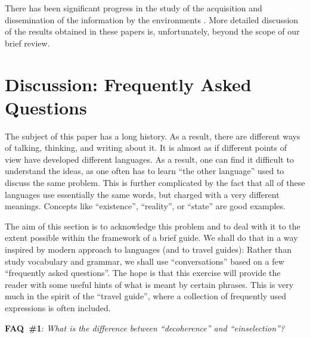 \documentclass[aps,amsmath,amssymb,amsfonts,floatfix]{revtex4-1}
\newcommand{\+}         {\dagger}
\begin{document}
{{{There has been significant progress in the study of the acquisition and dissemination of the information by the environments \cite{QD}. More detailed discussion of the results obtained in these papers is, unfortunately, beyond the scope of our brief review.


\section{Discussion: Frequently Asked Questions}

The subject of this paper has a long history. As a result, there are different ways of talking, thinking, and writing about it. It is almost as if different points of view have developed different languages. As a result, one can find it difficult to understand the ideas, as one often has to learn ``the other language'' used to discuss the same problem. This is further complicated by the fact that all of these languages use essentially the same words, but charged with a very different meanings. Concepts like ``existence'', ``reality'', or ``state'' are good examples.

The aim of this section is to acknowledge this problem and to deal with it to the extent possible within the framework of a brief guide. We shall do that in a way inspired by modern approach to languages (and to travel guides): Rather than study vocabulary and grammar, we shall use ``conversations'' based on a few ``frequently asked questions''. 
The hope is that this exercise will provide the reader with some useful hints of what is meant by certain phrases. This is very much in the spirit of the ``travel guide'', where a collection of frequently used expressions is often included.

{\bf FAQ~\#1}: {\it What is the difference between ``decoherence'' and ``einselection''?}

}}}
\end{document}
